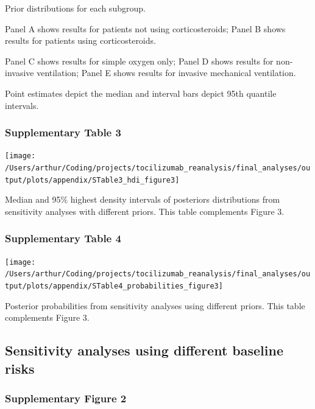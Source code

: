\documentclass[
]{article}
\begin{document}
Prior distributions for each subgroup.

Panel A shows results for patients not using corticosteroids; Panel B
shows results for patients using corticosteroids.

Panel C shows results for simple oxygen only; Panel D shows results for
non-invasive ventilation; Panel E shows results for invasive mechanical
ventilation.

Point estimates depict the median and interval bars depict 95th quantile
intervals.

\hypertarget{supplementary-table-3}{%
\subsubsection{Supplementary Table 3}\label{supplementary-table-3}}

\begin{center}\texttt{[image: /Users/arthur/Coding/projects/tocilizumab\_reanalysis/final\_analyses/output/plots/appendix/STable3\_hdi\_figure3]} \end{center}

Median and 95\% highest density intervals of posteriors distributions
from sensitivity analyses with different priors. This table complements
Figure 3.

\hypertarget{supplementary-table-4}{%
\subsubsection{Supplementary Table 4}\label{supplementary-table-4}}

\begin{center}\texttt{[image: /Users/arthur/Coding/projects/tocilizumab\_reanalysis/final\_analyses/output/plots/appendix/STable4\_probabilities\_figure3]} \end{center}

Posterior probabilities from sensitivity analyses using different
priors. This table complements Figure 3.

\newpage

\hypertarget{sensitivity-analyses-using-different-baseline-risks}{%
\subsection{Sensitivity analyses using different baseline
risks}\label{sensitivity-analyses-using-different-baseline-risks}}

\hypertarget{supplementary-figure-2}{%
\subsubsection{Supplementary Figure 2}\label{supplementary-figure-2}}
\end{document}
